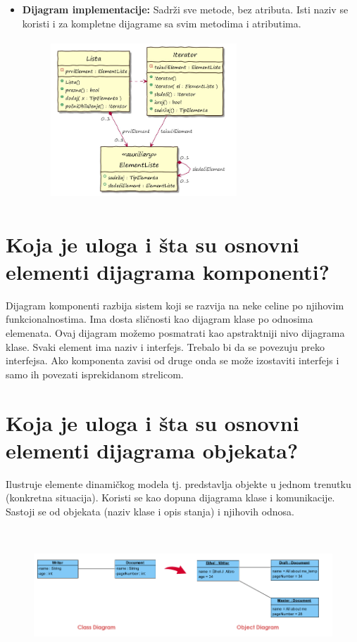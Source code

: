 \documentclass[a4paper]{article}
\begin{document}
\begin{itemize}
    \item \textbf{Dijagram implementacije:} Sadrži sve metode, bez atributa. Isti naziv se koristi i za kompletne dijagrame sa svim metodima i atributima.

  \begin{figure}[H]
    \begin{center}
        \includegraphics[width=70mm,height=60mm]{Slike/dijagram-implementacije.png}
    \end{center}
  \end{figure} 

   \end{itemize}

\section{Koja je uloga i šta su osnovni elementi dijagrama komponenti?}
  Dijagram komponenti razbija sistem koji se razvija na neke celine po njihovim funkcionalnostima.
  Ima dosta sličnosti kao dijagram klase po odnosima elemenata. Ovaj dijagram možemo posmatrati
  kao apstraktniji nivo dijagrama klase. Svaki element ima naziv i interfejs. Trebalo bi da se
  povezuju preko interfejsa. Ako komponenta zavisi od druge onda se može izostaviti interfejs
  i samo ih povezati isprekidanom strelicom.

\section{Koja je uloga i šta su osnovni elementi dijagrama objekata?}
  Ilustruje elemente dinamičkog modela tj. predstavlja objekte u jednom trenutku (konkretna situacija). 
  Koristi se kao dopuna dijagrama klase i komunikacije. Sastoji se od objekata (naziv klase i opis stanja)
  i njihovih odnosa.
  \begin{figure}[H]
    \begin{center}
        \includegraphics[width=120mm,height=50mm]{Slike/uml_objekat.png}
    \end{center}
  \end{figure} 
\end{document}
